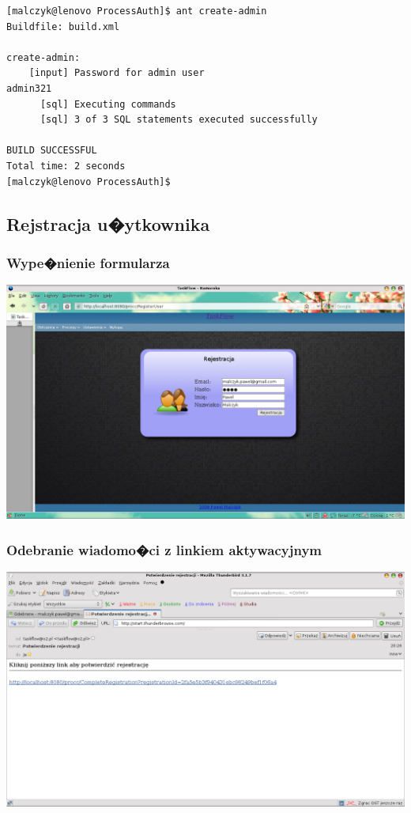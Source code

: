 \documentclass{article}
\begin{document}
{\tiny
\begin{verbatim}
[malczyk@lenovo ProcessAuth]$ ant create-admin
Buildfile: build.xml

create-admin:
    [input] Password for admin user
admin321
      [sql] Executing commands
      [sql] 3 of 3 SQL statements executed successfully

BUILD SUCCESSFUL
Total time: 2 seconds
[malczyk@lenovo ProcessAuth]$ 

\end{verbatim}
}

\subsection{Rejstracja u�ytkownika}

\subsubsection{Wype�nienie formularza}
\includegraphics[scale=0.4]{img/reg1.png}
\subsubsection{Odebranie wiadomo�ci z linkiem aktywacyjnym}
\includegraphics[scale=0.4]{img/reg2.png}
\end{document}
